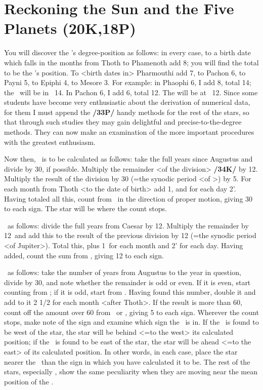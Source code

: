\section{Reckoning the Sun and the Five Planets (20K,18P)}
You will discover the \Sun’s degree-position as follows: in every case, to a birth date which falls in the months from Thoth to Phamenoth add 8\deg; you will find the total to be the \Sun’s position. To <birth dates in> Pharmouthi add 7\deg, to Pachon 6\deg, to Payni 5\deg, to Epiphi 4\deg, to Mesore 3\deg. For example: in Phaophi 6, I add 8\deg, total 14; the \Sun\, will be in \Libra\, 14\deg. In Pachon 6, I add 6\deg, total 12. The \Sun will be at \Taurus\, 12\deg.
Since some students have become very enthusiastic about the derivation of numerical data, for them I must append the \textbf{/33P/} handy methods for the rest of the stars, so that through such studies they may gain delightful and precise-to-the-degree methods. They can now make an examination of the more important procedures with the greatest enthusiasm.

Now then, \Saturn\, is to be calculated as follows: take the full years since Augustus and divide by 30, if possible. Multiply the remainder <of the division> \textbf{/34K/} by 12\deg. Multiply the result of the division by 30 (=the synodic period <of \Saturn>) by 5\deg. For each month from Thoth <to the date of birth> add 1\deg, and for each day 2'. Having totaled all this, count from \Cancer\, in the direction of proper motion, giving 30\deg\, to each sign. The star will be where the count stops.

\Jupiter\, as follows: divide the full years from Caesar by 12. Multiply the remainder by 12\deg\, and add
this to the result of the previous division by 12 (=the synodic period <of Jupiter>). Total this, plus 1\deg\, for each month and 2' for each day. Having added, count the sum from \Taurus, giving 12 to each sign.

\Mars\, as follows: take the number of years from Augustus to the year in question, divide by 30, and note whether the remainder is odd or even. If it is even, start counting from \Aries; if it is odd, start from \Libra. Having found this number, double it and add to it 2 1/2 for each month <after Thoth>. If the result is more than 60, count off the amount over 60 from \Libra\, or \Aries, giving 5 to each sign. Wherever the count stops, make note of the sign and examine which sign the \Sun\, is in. If the \Sun\, is found to be west of the star, the star will be behind <=to the west> its calculated position; if the \Sun\, is found to be east of the star, the star will be ahead <=to the east> of its calculated position. In other words, in each case, place the
star nearer the \Sun\, than the sign in which you have calculated it to be. The rest of the stars, especially \Venus, show the same peculiarity when they are moving near the mean position of the \Sun.

